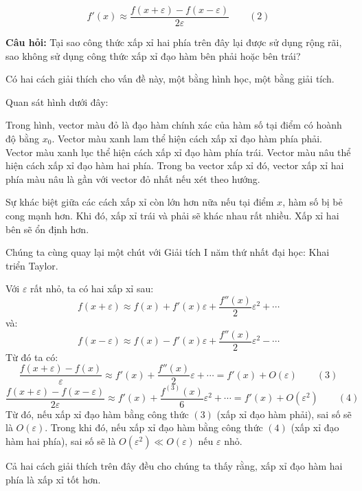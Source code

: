 \begin{congthuc}[title={Xấp xỉ đạo hàm hai phía}]
\[
f'(x) \approx \frac{f(x + \varepsilon) - f(x - \varepsilon)}{2\varepsilon} \qquad (2)
\]
\end{congthuc}

\begin{luuy}[title={Tại sao xấp xỉ hai phía?}]
\textbf{Câu hỏi:} Tại sao công thức xấp xỉ hai phía trên đây lại được sử dụng rộng rãi, sao không sử dụng công thức xấp xỉ đạo hàm bên phải hoặc bên trái?

Có hai cách giải thích cho vấn đề này, một bằng hình học, một bằng giải tích.
\end{luuy}

\begin{ynghia}[title={Giải thích bằng hình học: Ba vector xấp xỉ so với đạo hàm chính xác}]
Quan sát hình dưới đây:


Trong hình, vector màu đỏ là đạo hàm chính xác của hàm số tại điểm có hoành độ bằng $x_0$. Vector màu xanh lam thể hiện cách xấp xỉ đạo hàm phía phải. Vector màu xanh lục thể hiện cách xấp xỉ đạo hàm phía trái. Vector màu nâu thể hiện cách xấp xỉ đạo hàm hai phía. Trong ba vector xấp xỉ đó, vector xấp xỉ hai phía màu nâu là gần với vector đỏ nhất nếu xét theo hướng.

Sự khác biệt giữa các cách xấp xỉ còn lớn hơn nữa nếu tại điểm $x$, hàm số bị bẻ cong mạnh hơn. Khi đó, xấp xỉ trái và phải sẽ khác nhau rất nhiều. Xấp xỉ hai bên sẽ ổn định hơn.
\end{ynghia}

\begin{phuongphap}[title={Giải thích bằng giải tích: Khai triển Taylor và sai số $O(\varepsilon)$ vs.\ $O(\varepsilon^2)$}]
Chúng ta cùng quay lại một chút với Giải tích I năm thứ nhất đại học: Khai triển Taylor.

Với $\varepsilon$ rất nhỏ, ta có hai xấp xỉ sau:
\[
f(x + \varepsilon) \approx f(x) + f'(x)\varepsilon + \frac{f''(x)}{2} \varepsilon^2 + \cdots
\]
và:
\[
f(x - \varepsilon) \approx f(x) - f'(x)\varepsilon + \frac{f''(x)}{2} \varepsilon^2 - \cdots
\]
Từ đó ta có:
\[
\frac{f(x + \varepsilon) - f(x)}{\varepsilon} \approx f'(x) + \frac{f''(x)}{2}\varepsilon + \cdots = f'(x) + O(\varepsilon) \qquad (3)
\]
\[
\frac{f(x + \varepsilon) - f(x - \varepsilon)}{2\varepsilon} \approx f'(x) + \frac{f^{(3)}(x)}{6}\varepsilon^2 + \cdots = f'(x) + O(\varepsilon^2) \qquad (4)
\]
Từ đó, nếu xấp xỉ đạo hàm bằng công thức $(3)$ (xấp xỉ đạo hàm phải), sai số sẽ là $O(\varepsilon)$. Trong khi đó, nếu xấp xỉ đạo hàm bằng công thức $(4)$ (xấp xỉ đạo hàm hai phía), sai số sẽ là $O(\varepsilon^2) \ll O(\varepsilon)$ nếu $\varepsilon$ nhỏ.

Cả hai cách giải thích trên đây đều cho chúng ta thấy rằng, xấp xỉ đạo hàm hai phía là xấp xỉ tốt hơn.
\end{phuongphap}

